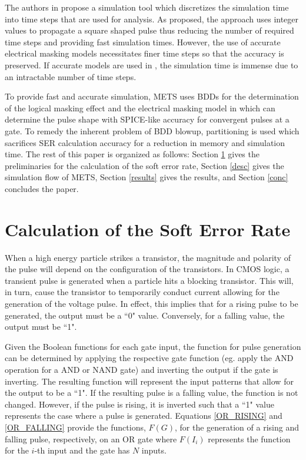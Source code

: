 \documentclass[conference]{IEEEtran}
\begin{document}
The authors in \cite{Gangadhar2011} propose a simulation tool which discretizes the simulation time into time steps that are used for analysis. As proposed, the approach uses integer values to propagate a square shaped pulse thus reducing the number of required time steps and providing fast simulation times. However, the use of accurate electrical masking models necessitates finer time steps so that the accuracy is preserved. If accurate models are used in \cite{Gangadhar2011}, the simulation time is immense due to an intractable number of time steps.

To provide fast and accurate simulation, METS uses BDDs for the determination of the logical masking effect and the electrical masking model in \cite{Watkins2016} which can determine the pulse shape with SPICE-like accuracy for convergent pulses at a gate. To remedy the inherent problem of BDD blowup, partitioning is used which sacrifices SER calculation accuracy for a reduction in memory and simulation time. The rest of this paper is organized as follows: Section \ref{probfunc} gives the preliminaries for the calculation of the soft error rate, Section \ref{desc} gives the simulation flow of METS, Section \ref{results} gives the results, and Section \ref{conc} concludes the paper.

\section{Calculation of the Soft Error Rate} \label{probfunc}

When a high energy particle strikes a transistor, the magnitude and polarity of the pulse will depend on the configuration of the transistors. In CMOS logic, a transient pulse is generated when a particle hits a blocking transistor. This will, in turn, cause the transistor to temporarily conduct current allowing for the generation of the voltage pulse. In effect, this implies that for a rising pulse to be generated, the output must be a ``0" value. Conversely, for a falling value, the output must be ``1". 

Given the Boolean functions for each gate input, the function for pulse generation can be determined by applying the respective gate function (eg. apply the AND operation for a AND or NAND gate) and inverting the output if the gate is inverting. The resulting function will represent the input patterns that allow for the output to be a ``1". If the resulting pulse is a falling value, the function is not changed. However, if the pulse is rising, it is inverted such that a ``1" value represents the case where a pulse is generated. Equations \ref{OR_RISING} and \ref{OR_FALLING} provide the functions, $F(G)$, for the generation of a rising and falling pulse, respectively, on an OR gate where $F(I_i)$ represents the function for the $i$-th input and the gate has $N$ inputs.
\end{document}
